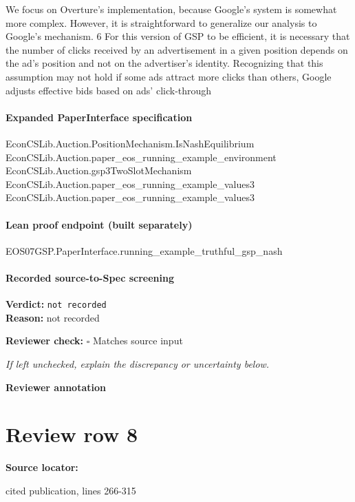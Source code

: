 \documentclass[10pt]{article}
\newcommand{\reviewerbox}{%
  \par\noindent\fbox{\parbox{0.96\linewidth}{\rule{0pt}{0.38in}}}\par
}
\newcommand{\reviewmatch}[1]{%
  \par\noindent\textbf{Reviewer check:} $\square$\; #1\par
  \noindent\emph{If left unchecked, explain the discrepancy or uncertainty below.}\par
}
\begin{document}
\begin{ReviewVerbatim}
We focus on Overture’s implementation, because Google’s system is somewhat more complex. However, it is
straightforward to generalize our analysis to Google’s mechanism.
6
For this version of GSP to be efficient, it is necessary that the number of clicks received by an advertisement in
a given position depends on the ad’s position and not on the advertiser’s identity. Recognizing that this assumption
may not hold if some ads attract more clicks than others, Google adjusts effective bids based on ads’ click-through
\end{ReviewVerbatim}


\paragraph{Expanded PaperInterface specification}
\begin{ReviewVerbatim}
EconCSLib.Auction.PositionMechanism.IsNashEquilibrium EconCSLib.Auction.paper_eos_running_example_environment
  EconCSLib.Auction.gsp3TwoSlotMechanism EconCSLib.Auction.paper_eos_running_example_values3
  EconCSLib.Auction.paper_eos_running_example_values3
\end{ReviewVerbatim}

\paragraph{Lean proof endpoint (built separately)}\begin{ReviewVerbatim}
EOS07GSP.PaperInterface.running_example_truthful_gsp_nash
\end{ReviewVerbatim}

\paragraph{Recorded source-to-Spec screening}
\textbf{Verdict:} \texttt{not recorded}
\\
\textbf{Reason:} not recorded
\reviewmatch{Matches source input}
\noindent\textbf{Reviewer annotation}\par
\reviewerbox
\clearpage
\hypertarget{source-claim-110a524c6dbd4f91}{}
\section*{Review row 8}
\textbf{Source locator:} {\footnotesize\raggedright cited publication, lines 266-\allowbreak{}315\par}
\end{document}
